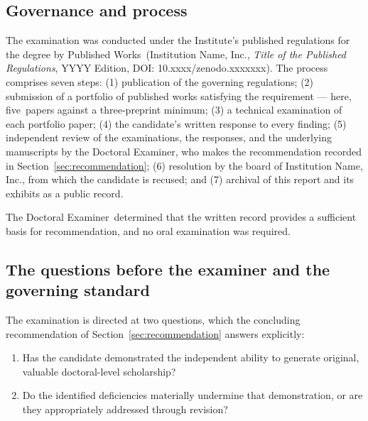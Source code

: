 \documentclass[11pt]{article}
\newcommand{\institution}{Institution Name, Inc.}
\newcommand{\board}{the board of \institution}
\newcommand{\degreeRoute}{by Published Works}
\newcommand{\regsTitle}{\emph{Title of the Published Regulations}, YYYY Edition}
\newcommand{\regsDOI}{10.xxxx/zenodo.xxxxxxx}
\newcommand{\examinerRole}{Doctoral Examiner}
\newcommand{\numPapers}{five}
\newcommand{\minPapers}{three}
\newif\iforalexam       \oralexamfalse       %
\newif\ifdraftnotes     \draftnotesfalse     %
\newcommand{\note}[1]{\ifdraftnotes\textcolor{red}{\small[\,#1\,]}\fi}
\begin{document}
\subsection{Governance and process}\label{sec:process}

The examination was conducted under the Institute's published regulations for
the degree \degreeRoute\ (\institution, \regsTitle, DOI: \regsDOI). The process
comprises seven steps: (1) publication of the governing regulations;
(2) submission of a portfolio of published works satisfying the requirement ---
here, \numPapers\ papers against a \minPapers-preprint minimum; (3) a technical
examination of each portfolio paper; (4) the candidate's written response to
every finding; (5) independent review of the examinations, the responses, and
the underlying manuscripts by the \examinerRole, who makes the recommendation
recorded in Section~\ref{sec:recommendation}; (6) resolution by \board, from
which the candidate is recused; and (7) archival of this report and its exhibits
as a public record.
\iforalexam
An oral examination was held on \note{date}; its record is Exhibit~\note{X}.
\else
The \examinerRole\ determined that the written record provides a sufficient
basis for recommendation, and no oral examination was required.
\fi

\note{State, paper by paper, the form of the technical examination (itemised
audit, review correspondence, or other), who prepared it, and in what
capacity. Where a paper was examined through correspondence in which the
\examinerRole\ acted as reviewer, say so here and deposit the correspondence
in full as an exhibit.}

\subsection{The questions before the examiner and the governing standard}\label{sec:questions}

The examination is directed at two questions, which the concluding
recommendation of Section~\ref{sec:recommendation} answers explicitly:

\begin{enumerate}[label=\textbf{Q\arabic*.},leftmargin=3em]
\item Has the candidate demonstrated the independent ability to generate
      original, valuable doctoral-level scholarship?
\item Do the identified deficiencies materially undermine that demonstration,
      or are they appropriately addressed through revision?
\end{enumerate}
\end{document}
